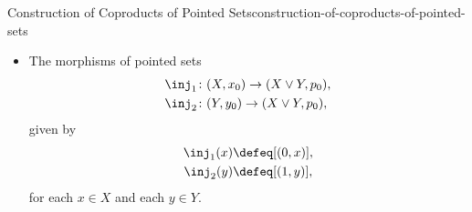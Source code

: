 \begin{construction}{Construction of Coproducts of Pointed Sets}{construction-of-coproducts-of-pointed-sets}
\begin{itemize}
\begin{itemize}
\begin{align*}
                              &=      [(1,y_{0})].
                    \end{align*}
            \end{itemize}
        \item{}The morphisms of pointed sets
            \begin{align*}
                \inj_{1} &\colon (X,x_{0}) \to (X\vee Y,p_{0}),\\
                \inj_{2} &\colon (Y,y_{0}) \to (X\vee Y,p_{0}),
            \end{align*}
            given by
            \begin{align*}
                \inj_{1}(x) &\defeq [(0,x)],\\
                \inj_{2}(y) &\defeq [(1,y)],
            \end{align*}
            for each $x\in X$ and each $y\in Y$.
    \end{itemize}
\end{construction}
